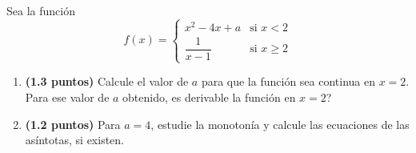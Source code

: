 
Sea la función
\[
f(x)=\begin{cases}
x^2-4x+a & \text{si }x<2\\[4pt]
\dfrac{1}{x-1} & \text{si }x\geq2
\end{cases}
\]
\begin{enumerate}[label=\alph*)]
\item \textbf{(1.3 puntos)} Calcule el valor de $a$ para que la función sea continua en $x=2$. Para ese valor de $a$ obtenido, \textquestiondown{}es derivable la función en $x=2$?
\item \textbf{(1.2 puntos)} Para $a=4$, estudie la monotonía y calcule las ecuaciones de las asíntotas, si existen.
\end{enumerate}
